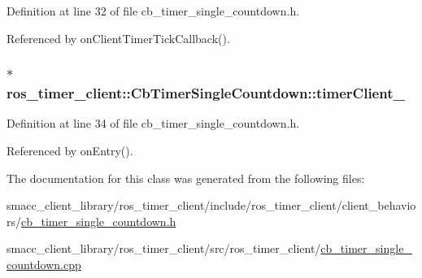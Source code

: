 Definition at line 32 of file cb\+\_\+timer\+\_\+single\+\_\+countdown.\+h.



Referenced by on\+Client\+Timer\+Tick\+Callback().

\subsubsection[{\texorpdfstring{timer\+Client\+\_\+}{timerClient_}}]{$\ast$ ros\+\_\+timer\+\_\+client\+::\+Cb\+Timer\+Single\+Countdown\+::timer\+Client\+\_\+\hspace{0.3cm}{\ttfamily [private]}}\hypertarget{classros__timer__client_1_1CbTimerSingleCountdown_aacb6539b70c5a2cbb6c410dc2faf814e}{}\label{classros__timer__client_1_1CbTimerSingleCountdown_aacb6539b70c5a2cbb6c410dc2faf814e}


Definition at line 34 of file cb\+\_\+timer\+\_\+single\+\_\+countdown.\+h.



Referenced by on\+Entry().



The documentation for this class was generated from the following files\+:\begin{DoxyCompactItemize}
\item 
smacc\+\_\+client\+\_\+library/ros\+\_\+timer\+\_\+client/include/ros\+\_\+timer\+\_\+client/client\+\_\+behaviors/\hyperlink{cb__timer__single__countdown_8h}{cb\+\_\+timer\+\_\+single\+\_\+countdown.\+h}\item 
smacc\+\_\+client\+\_\+library/ros\+\_\+timer\+\_\+client/src/ros\+\_\+timer\+\_\+client/\hyperlink{cb__timer__single__countdown_8cpp}{cb\+\_\+timer\+\_\+single\+\_\+countdown.\+cpp}\end{DoxyCompactItemize}
